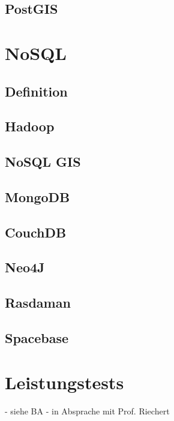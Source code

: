 \subsection{PostGIS}



\section{NoSQL}

\subsection{Definition}

\subsection{Hadoop}

\subsection{NoSQL GIS}

\subsection{MongoDB}

\subsection{CouchDB}

\subsection{Neo4J}

\newpage

\subsection{Rasdaman}



\subsection{Spacebase}


\section{Leistungstests}

- siehe BA
- in Absprache mit Prof. Riechert